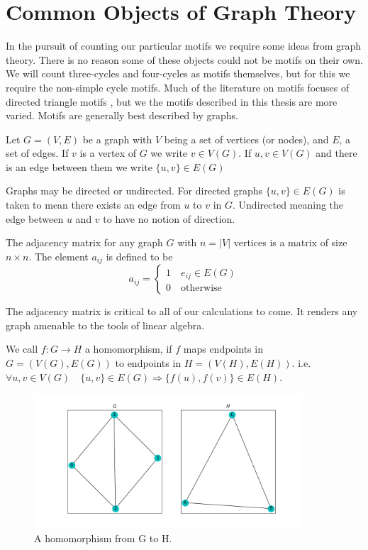 \section{Common Objects of Graph Theory}

In the pursuit of counting our particular motifs we require some
ideas from graph theory. There is no reason some of these objects could not be 
motifs on their own. We will count three-cycles and four-cycles
as motifs themselves, but for this we require the non-simple cycle motifs.
Much of the literature on motifs focuses of directed triangle motifs \cite{temporalmotifs} \cite{Milo824}, but 
we the motifs described in this thesis are more varied.
Motifs are generally best described by graphs. 

\begin{dfn}
    Let $G = (V,E)$ be a graph with $V$ being a set of vertices (or nodes), 
and $E$, a set of edges. If $v$ is a vertex of $G$ we write $v \in V(G)$.
If $u,v \in V(G)$ and there is an edge between them we 
write $\{u,v\} \in E(G)$
\end{dfn}

Graphs may be directed or undirected. For directed graphs $\{u,v\} \in E(G)$
is taken to mean there exists an edge from $u$ to $v$ in $G$. Undirected meaning the 
edge between $u$ and $v$ to have no notion of direction.

\begin{dfn}
    The adjacency matrix for any graph $G$ with $n=|V|$ vertices is a matrix of size
    $n \times n$. The element $a_{ij}$ is defined to be
    $$
    a_{ij} = 
    \begin{cases}
        1 \quad e_{ij} \in E(G)\\
        0 \quad \text{otherwise}
    \end{cases}
    $$
\end{dfn}

\noindent The adjacency matrix is critical to all of our calculations to come. It renders
any graph amenable to the tools of linear algebra.

\begin{dfn}
\label{def:homomorphism}
We call $f: G \rightarrow H$ a homomorphism,
if $f$ maps endpoints in $G=(V(G),E(G))$ to endpoints in $H=(V(H),E(H))$.
i.e. $ \forall u,v \in V(G) \quad \{u,v\} \in E(G) \Rightarrow \{f(u),
f(v)\} \in E(H)$.
\end{dfn}

\begin{figure}[h!]
    \includegraphics[width=10cm]{Images/graph_homomorphism.png}
    \centering
    \caption{A homomorphism from G to H.}
    \label{fig:homomorphism}
\end{figure}

